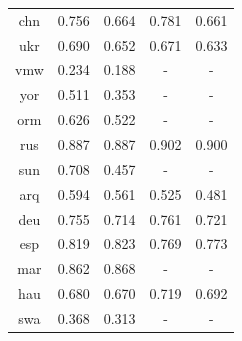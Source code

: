 \documentclass[11pt]{article}
\begin{document}
\begin{table}[]
\begin{tabular}{ccccc}
{\color[HTML]{212121} chn}          & {\color[HTML]{212121} 0.756} & {\color[HTML]{212121} 0.664} & {\color[HTML]{212121} 0.781} & {\color[HTML]{212121} 0.661} \\
{\color[HTML]{212121} ukr}          & {\color[HTML]{212121} 0.690} & {\color[HTML]{212121} 0.652} & {\color[HTML]{212121} 0.671} & {\color[HTML]{212121} 0.633} \\
{\color[HTML]{212121} vmw}          & {\color[HTML]{212121} 0.234} & {\color[HTML]{212121} 0.188} & -                            & -                            \\
{\color[HTML]{212121} yor}          & {\color[HTML]{212121} 0.511} & {\color[HTML]{212121} 0.353} & -                            & -                            \\
{\color[HTML]{212121} orm}          & {\color[HTML]{212121} 0.626} & {\color[HTML]{212121} 0.522} & -                            & -                            \\
{\color[HTML]{212121} rus}          & {\color[HTML]{212121} 0.887} & {\color[HTML]{212121} 0.887} & {\color[HTML]{212121} 0.902} & {\color[HTML]{212121} 0.900} \\
{\color[HTML]{212121} sun}          & {\color[HTML]{212121} 0.708} & {\color[HTML]{212121} 0.457} & -                            & -                            \\
{\color[HTML]{212121} arq}          & {\color[HTML]{212121} 0.594} & {\color[HTML]{212121} 0.561} & {\color[HTML]{212121} 0.525} & {\color[HTML]{212121} 0.481} \\
{\color[HTML]{212121} deu}          & {\color[HTML]{212121} 0.755} & {\color[HTML]{212121} 0.714} & {\color[HTML]{212121} 0.761} & {\color[HTML]{212121} 0.721} \\
{\color[HTML]{212121} esp}          & {\color[HTML]{212121} 0.819} & {\color[HTML]{212121} 0.823} & {\color[HTML]{212121} 0.769} & {\color[HTML]{212121} 0.773} \\
{\color[HTML]{212121} mar}          & {\color[HTML]{212121} 0.862} & {\color[HTML]{212121} 0.868} & -                            & -                            \\
{\color[HTML]{212121} hau}          & {\color[HTML]{212121} 0.680} & {\color[HTML]{212121} 0.670} & {\color[HTML]{212121} 0.719} & {\color[HTML]{212121} 0.692} \\
{\color[HTML]{212121} swa}          & {\color[HTML]{212121} 0.368} & {\color[HTML]{212121} 0.313} & -                            & -                            \\

\end{tabular}
\end{table}
\end{document}
